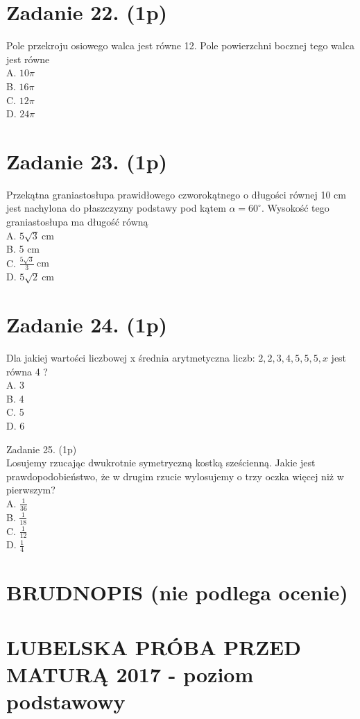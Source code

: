 \documentclass[10pt]{article}
\begin{document}
\section*{Zadanie 22. (1p)}
Pole przekroju osiowego walca jest równe 12. Pole powierzchni bocznej tego walca jest równe\\
A. \(10 \pi\)\\
B. \(16 \pi\)\\
C. \(12 \pi\)\\
D. \(24 \pi\)

\section*{Zadanie 23. (1p)}
Przekątna graniastosłupa prawidłowego czworokątnego o długości równej 10 cm jest nachylona do płaszczyzny podstawy pod kątem \(\alpha=60^{\circ}\). Wysokość tego graniastosłupa ma długość równą\\
A. \(5 \sqrt{3} \mathrm{~cm}\)\\
B. 5 cm\\
C. \(\frac{5 \sqrt{3}}{3} \mathrm{~cm}\)\\
D. \(5 \sqrt{2} \mathrm{~cm}\)

\section*{Zadanie 24. (1p)}
Dla jakiej wartości liczbowej x średnia arytmetyczna liczb: \(2,2,3,4,5,5,5, x\) jest równa 4 ?\\
A. 3\\
B. 4\\
C. 5\\
D. 6

Zadanie 25. (1p)\\
Losujemy rzucając dwukrotnie symetryczną kostką sześcienną. Jakie jest prawdopodobieństwo, że w drugim rzucie wylosujemy o trzy oczka więcej niż w pierwszym?\\
A. \(\frac{1}{36}\)\\
B. \(\frac{1}{18}\)\\
C. \(\frac{1}{12}\)\\
D. \(\frac{1}{4}\)

\section*{BRUDNOPIS (nie podlega ocenie)}
\section*{LUBELSKA PRÓBA PRZED MATURĄ 2017 - poziom podstawowy}
\end{document}
